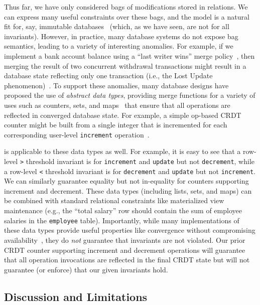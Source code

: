 Thus far, we have only considered bags of modifications stored in
relations. We can express many useful constraints over these bags, and
the model is a natural fit for, say, immutable
databases~\cite{gray-virtues,gray-book} (which, as we have seen, are
not \iconfluent for all invariants). However, in practice, many
database systems do not expose bag semantics, leading to a variety of
interesting anomalies. For example, if we implement a bank account
balance using a ``last writer wins'' merge policy~\cite{vogels-defs},
then merging the result of two concurrent withdrawal transactions
might result in a database state reflecting only one transaction
(i.e., the Lost Update phenomenon)~\cite{adya-isolation,hat-vldb}. To
support these anomalies, many database designs have proposed the use
of \textit{abstract data types}, providing merge functions for a
variety of uses such as counters, sets, and
maps~\cite{crdt,atomictransactions,weihl-thesis,blooml} that ensure
that all operations are reflected in converged database state. For
example, a simple op-based CRDT counter might be built from a single
integer that is incremented for each corresponding user-level
\texttt{increment} operation~\cite{crdt}.

\iconfluence is applicable to these data types as well. For example,
it is easy to see that a row-level \texttt{>} threshold invariant is
\iconfluent for \texttt{increment} and \texttt{update} but not
\texttt{decrement}, while a row-level \texttt{<} threshold invariant
is \iconfluent for \texttt{decrement} and \texttt{update} but not
\texttt{increment}. We can similarly guarantee equality but not
in-equality for counters supporting increment and decrement. These
data types (including lists, sets, and maps) can be combined with
standard relational constraints like materialized view maintenance
(e.g., the ``total salary'' row should contain the sum of employee
salaries in the \texttt{employee} table). Importantly, while many
implementations of these data types provide useful properties like
convergence without compromising availability~\cite{blooml,crdt}, they
do \textit{not} guarantee that invariants are not violated. Our prior
CRDT counter supporting increment and decrement operations will
guarantee that all operation invocations are reflected in the final
CRDT state but will not guarantee (or enforce) that our given
invariants hold.

\subsection{Discussion and Limitations}

